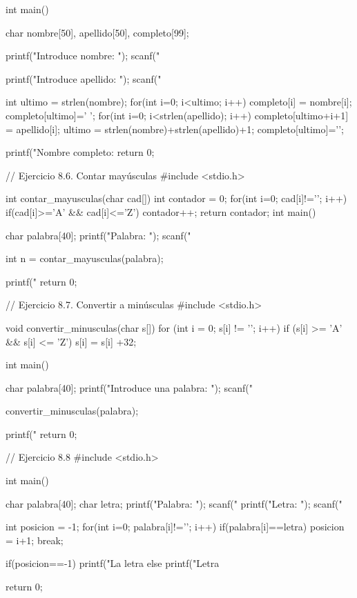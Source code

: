 int main() {
   char nombre[50], apellido[50], completo[99];
   
   printf("Introduce nombre: ");
   scanf("%
   
   printf("Introduce apellido: ");
   scanf("%
   
   int ultimo = strlen(nombre);
   for(int i=0; i<ultimo; i++) {
      completo[i] = nombre[i];
   }
   completo[ultimo]=' ';
   for(int i=0; i<strlen(apellido); i++) {
      completo[ultimo+i+1] = apellido[i]; 
   }
   ultimo = strlen(nombre)+strlen(apellido)+1;
   completo[ultimo]='\0';
   
   printf("Nombre completo: %
   return 0;
}


// Ejercicio 8.6. Contar mayúsculas
#include <stdio.h>

int contar_mayusculas(char cad[]) {
   int contador = 0;
   for(int i=0; cad[i]!='\0'; i++) {
      if(cad[i]>='A' && cad[i]<='Z') {
         contador++;
      }
   }
   return contador;
}
int main() {
   char palabra[40];
   printf("Palabra: ");
   scanf("%
   
   int n = contar_mayusculas(palabra);
   
   printf("%
   return 0;
}


// Ejercicio 8.7. Convertir a minúsculas
#include <stdio.h>

void convertir_minusculas(char s[]) {
   for (int i = 0; s[i] != '\0'; i++) {
      if (s[i] >= 'A' && s[i] <= 'Z') {
         s[i] = s[i] +32;
      }
   }
}

int main() {
   char palabra[40];
   printf("Introduce una palabra: ");
   scanf("%
   
   convertir_minusculas(palabra);
   
   printf("%
   return 0;
}   


// Ejercicio 8.8
#include <stdio.h>

int main() {
   char palabra[40];
   char letra;
   printf("Palabra: ");
   scanf("%
   printf("Letra: ");
   scanf(" %
   
   int posicion = -1;
   for(int i=0; palabra[i]!='\0'; i++) {
      if(palabra[i]==letra) {
         posicion = i+1;
         break;
      }
   }
   
   if(posicion==-1) {
      printf("La letra %
   } else {
      printf("Letra %
   }
   
   return 0;
}   


